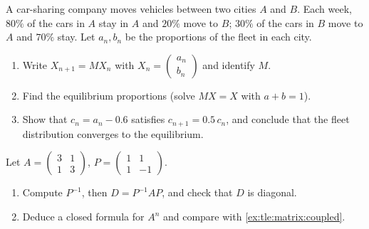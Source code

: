 \begin{exercise}[$\star\star$]\label{exo:tle:matrix:7}
A car-sharing company moves vehicles between two cities $A$ and $B$. Each
week, $80\%$ of the cars in $A$ stay in $A$ and $20\%$ move to $B$; $30\%$
of the cars in $B$ move to $A$ and $70\%$ stay. Let $a_n, b_n$ be the
proportions of the fleet in each city.
\begin{omfigure}
\end{omfigure}
\begin{enumerate}
  \item Write $X_{n+1} = MX_n$ with
        $X_n = \begin{pmatrix} a_n\\ b_n\end{pmatrix}$ and identify $M$.
  \item Find the equilibrium proportions (solve $MX = X$ with
        $a + b = 1$).
  \item Show that $c_n = a_n - 0.6$ satisfies $c_{n+1} = 0.5\,c_n$, and
        conclude that the fleet distribution converges to the equilibrium.
\end{enumerate}
\end{exercise}

\begin{exercise}[$\star\star\star$]\label{exo:tle:matrix:8}
Let $A = \begin{pmatrix} 3 & 1\\ 1 & 3 \end{pmatrix}$,
$P = \begin{pmatrix} 1 & 1\\ 1 & -1 \end{pmatrix}$.
\begin{enumerate}
  \item Compute $P^{-1}$, then $D = P^{-1}AP$, and check that $D$ is
        diagonal.
  \item Deduce a closed formula for $A^n$ and compare with
        \cref{ex:tle:matrix:coupled}.
\end{enumerate}
\end{exercise}

